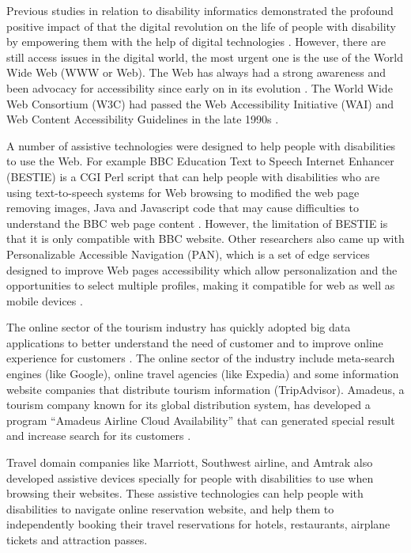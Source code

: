 Previous studies in relation to disability informatics  demonstrated 
the profound positive impact of  that the digital revolution on the life
of people with disability by empowering them with the help of digital 
technologies \cite{Appleyard2005}. However, there are still access issues 
in the digital world, the most urgent one is the use of the World Wide Web 
(WWW or Web). The Web has always had a strong awareness and been advocacy 
for accessibility since early on in its evolution \cite{Appleyard2005}. 
The World Wide Web Consortium (W3C) had passed the Web Accessibility Initiative
(WAI) and Web Content Accessibility Guidelines in the late 1990s \cite{Appleyard2005}. 

A number of assistive technologies were designed to help people with 
disabilities to use the Web. For example BBC Education Text to Speech 
Internet Enhancer (BESTIE) is a CGI Perl script that can help people 
with disabilities who are using text-to-speech systems for Web browsing 
to modified the web page removing images, Java and Javascript code
that may cause difficulties to understand the BBC web page content \cite{Erra}. 
However, the limitation of BESTIE is that it is only compatible with BBC 
website. Other researchers also came up with Personalizable Accessible 
Navigation (PAN), which is a set of edge services designed to improve 
Web pages accessibility which allow  personalization and the opportunities 
to select multiple profiles, making it compatible for web as well as mobile 
devices \cite{info:doi/10.2196/mhealth.3956}. 

The online sector of the tourism industry has quickly adopted big data 
applications to better understand the need of customer and to improve 
online experience for customers \cite{akerkar2012}. The online sector 
of the industry include  meta-search engines (like Google), online 
travel agencies (like Expedia) and some information website companies 
that distribute tourism information (TripAdvisor)\cite{MIAH2017}. 
Amadeus, a tourism company known for its global distribution system, 
has developed a program ``Amadeus Airline Cloud Availability'' that 
can generated special result and increase search for its customers \cite{Shafiee16}.

Travel domain companies like Marriott, Southwest airline, and Amtrak 
also developed assistive devices specially for people with disabilities 
to use when browsing their websites. These assistive technologies can 
help people with disabilities to navigate online reservation website, 
and help them to independently booking their travel reservations for 
hotels, restaurants, airplane tickets and attraction passes.

